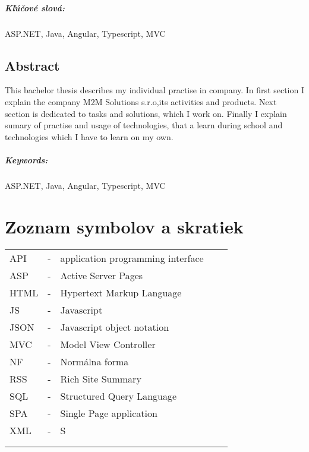 \documentclass[11pt, oneside]{report}
\begin{document}
\paragraph*{Kľúčové slová:} ASP.NET, Java, Angular, Typescript, MVC

\paragraph*{}

\section*{Abstract}
This bachelor thesis describes my individual practise in company. In first section I explain the company  M2M Solutions s.r.o,its activities and products. Next section is dedicated to tasks and solutions, which I work on. Finally I explain sumary of practise and usage of technologies, that a learn during school and technologies which I have to learn on my own.


\paragraph*{Keywords:}  ASP.NET, Java, Angular, Typescript, MVC




\newpage 
\tableofcontents



\newpage

\chapter*{ Zoznam symbolov a skratiek }
\begin{table}[H]
\label{my-label}
\begin{tabular}{lllll}
API  & - &  application programming interface &  &  \\
ASP&- &Active Server Pages  &  &  \\
HTML & - &  Hypertext Markup Language&  &  \\
JS   & - & Javascript  &  &  \\
JSON & - & Javascript object notation &  &  \\
MVC  & - &  Model View Controller &  &  \\
NF & - &  Normálna forma &  &  \\
RSS & - &  Rich Site Summary &  &  \\
SQL  & - &  Structured Query Language&  &  \\
SPA  & - &  Single Page application&  &  \\
XML  & - &  S&  &  \\
 &  &  &  &  \\
 &  &  &  & 
\end{tabular}
\end{table}
\newpage 
\end{document}
